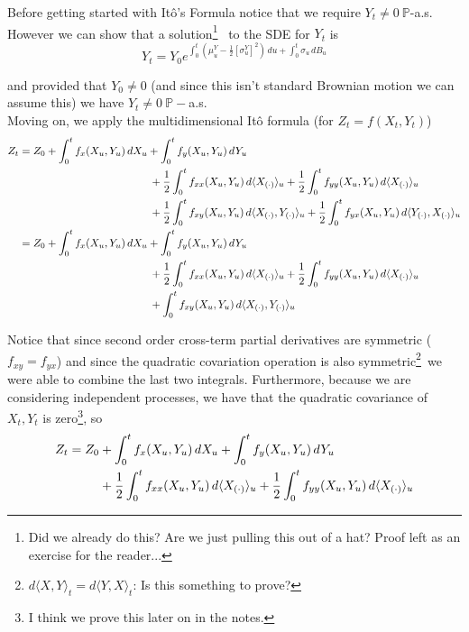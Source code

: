\documentclass[12pt]{article}
\newlength\tindent
\renewcommand{\indent}{\hspace*{\tindent}}
\begin{document}
\indent Before getting started with It\^{o}'s Formula notice that we require $Y_t \neq 0 ~\mathbb P$-a.s. However we can show that a solution\footnote{Did we already do this? Are we just pulling this out of a hat? Proof left as an exercise for the reader...}~ to the SDE for $Y_t$ is
\begin{equation*}
	Y_t = Y_0e^{\int^t_0(\mu^Y_u - \frac{1}{2}[\sigma^Y_u]^2)\,du + \int^t_0\sigma_u\,dB_u}
\end{equation*}

and provided that $Y_0 \neq 0$ (and since this isn't standard Brownian motion we can assume this) we have $Y_t \neq 0~\mathbb P-$a.s. \\

Moving on, we apply the multidimensional It\^{o} formula (for $Z_t = f(X_t,Y_t)$)
\begin{align*}
	Z_t &= Z_0 + \int^t_0 f_x(X_u,Y_u)\,dX_u + \int^t_0 f_y(X_u,Y_u)\,dY_u \\
	&\hphantom{{}={-----------}} + \frac{1}{2}\int^t_0 f_{xx}(X_u,Y_u)\,d\langle X_{(\cdot)}\rangle_u + \frac{1}{2}\int^t_0 f_{yy}(X_u,Y_u)\,d\langle X_{(\cdot)}\rangle_u \\
	&\hphantom{{}={-----------}} + \frac{1}{2}\int^t_0 f_{xy}(X_u,Y_u)\,d\langle X_{(\cdot)},Y_{(\cdot)}\rangle_u + \frac{1}{2}\int^t_0 f_{yx}(X_u,Y_u)\,d\langle Y_{(\cdot)},X_{(\cdot)}\rangle_u \\
	&= Z_0 + \int^t_0 f_x(X_u,Y_u)\,dX_u + \int^t_0 f_y(X_u,Y_u)\,dY_u \\
	&\hphantom{{}={-----------}} + \frac{1}{2}\int^t_0 f_{xx}(X_u,Y_u)\,d\langle X_{(\cdot)}\rangle_u + \frac{1}{2}\int^t_0 f_{yy}(X_u,Y_u)\,d\langle X_{(\cdot)}\rangle_u \\
	&\hphantom{{}={-----------}} + \int^t_0 f_{xy}(X_u,Y_u)\,d\langle X_{(\cdot)},Y_{(\cdot)}\rangle_u
\end{align*}

\indent Notice that since second order cross-term partial derivatives are symmetric ($f_{xy} = f_{yx}$) and since the quadratic covariation operation is also symmetric\footnote{$d\langle X, Y\rangle_t = d\langle Y, X\rangle_t$: Is this something to prove?}~we were able to combine the last two integrals. Furthermore, because we are considering independent processes, we have that the quadratic covariance of $X_t,Y_t$ is zero\footnote{I think we prove this later on in the notes.}, so
\begin{align*}
	Z_t &= Z_0 + \int^t_0 f_x(X_u,Y_u)\,dX_u + \int^t_0 f_y(X_u,Y_u)\,dY_u \\
	&\hphantom{{}={Z_0}} + \frac{1}{2}\int^t_0 f_{xx}(X_u,Y_u)\,d\langle X_{(\cdot)}\rangle_u + \frac{1}{2}\int^t_0 f_{yy}(X_u,Y_u)\,d\langle X_{(\cdot)}\rangle_u
\end{align*}
\end{document}
